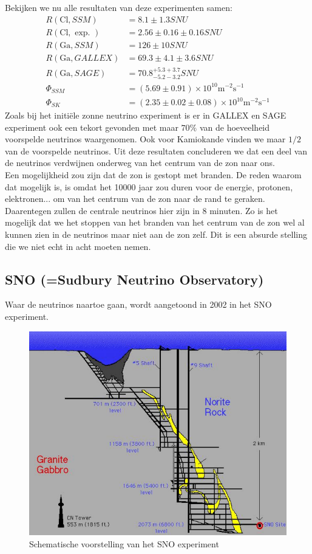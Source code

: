 \documentclass[../main.tex]{subfiles}
\begin{document}
Bekijken we nu alle resultaten van deze experimenten samen:
\begin{equation}
    \begin{aligned}
        \label{eq:zonne_neutrino_resultaten}
        R(\mathrm{Cl}, S S M) &=8.1 \pm 1.3 S N U \\
        R(\mathrm{Cl}, \text { exp. }) &=2.56 \pm 0.16 \pm 0.16 S N U \\
        R(\mathrm{Ga}, S S M) &=126 \pm 10 S N U \\
        R(\mathrm{Ga}, G A L L E X) &=69.3 \pm 4.1 \pm 3.6 S N U \\
        R(\mathrm{Ga}, S A G E) &=70.8_{-5.2-3.2}^{+5.3+3.7} S N U \\
        \Phi_{S S M} &=(5.69 \pm 0.91) \times 10^{10} \text{m}^{-2} \text{s}^{-1} \\
        \Phi_{S K} &=(2.35 \pm 0.02 \pm 0.08) \times 10^{10} \text{m}^{-2} \text{s}^{-1}
    \end{aligned}
\end{equation}
Zoals bij het initiële zonne neutrino experiment is er in GALLEX en SAGE experiment ook een tekort gevonden met maar $70\%$ van de hoeveelheid voorspelde neutrinos waargenomen. Ook voor Kamiokande vinden we maar $1/2$ van de voorspelde neutrinos. Uit deze resultaten concluderen we dat een deel van de neutrinos verdwijnen onderweg van het centrum van de zon naar ons.\\
Een mogelijkheid zou zijn dat de zon is gestopt met branden. De reden waarom dat mogelijk is, is omdat het 10000 jaar zou duren voor de energie, protonen, elektronen... om van het centrum van de zon naar de rand te geraken. Daarentegen zullen de centrale neutrinos hier zijn in 8 minuten. Zo is het mogelijk dat we het stoppen van het branden van het centrum van de zon wel al kunnen zien in de neutrinos maar niet aan de zon zelf. Dit is een absurde stelling die we niet echt in acht moeten nemen.

\subsection{SNO (=Sudbury Neutrino Observatory)}%
\label{sub:sno}

Waar de neutrinos naartoe gaan, wordt aangetoond in 2002 in het SNO experiment.

\begin{figure}[h]
    \centering
    \includegraphics[width=0.5\linewidth]{neutrinos/sno_schematisch.png}
    \caption{Schematische voorstelling van het SNO experiment}%
    \label{fig:neutrinos/sno_schematisch}
\end{figure}
\end{document}

